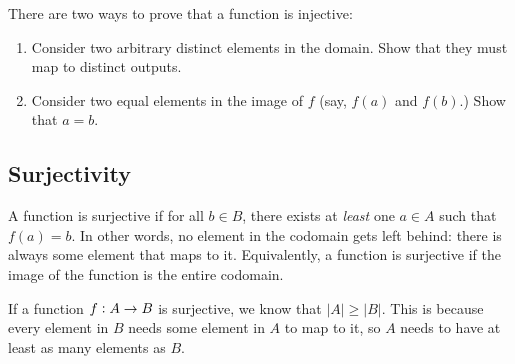 \documentclass[12pt,letterpaper]{article}
\begin{document}
    There are two ways to prove that a function is injective:
    \begin{enumerate}
        \item Consider two arbitrary distinct elements in the domain. Show that they must map to distinct outputs.
        \begin{mdframed}\vspace{2 cm}\end{mdframed}
    
        \item Consider two equal elements in the image of $f$ (say, $f(a)$ and $f(b)$.) Show that $a = b$.
    \begin{mdframed}\vspace{2 cm}\end{mdframed}
    \end{enumerate}
    
    \subsection{Surjectivity}
    A function is surjective if for all $b \in B$, there exists at \textit{least} one $a \in A$ such that $f(a) = b$. In other words, no element in the codomain gets left behind: there is always some element that maps to it. Equivalently, a function is surjective if the image of the function is the entire codomain.
    
    If a function $f \vcentcolon A \rightarrow B$ is surjective, we know that $|A| \geq |B|$. This is because every element in $B$ needs some element in $A$ to map to it, so $A$ needs to have at least as many elements as $B$.
    
    \begin{figure}[h]
     \centering
    \end{figure}
    
\end{document}
